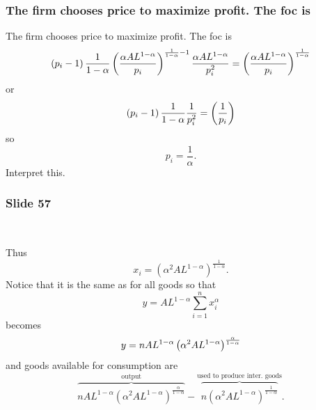 \documentclass[aspectratio=169]{ltx-talk}
\begin{document}
\begin{frame}
\frametitle{The firm chooses price to maximize profit. The foc is}
The firm chooses price to maximize profit. The foc is%
\begin{equation*}
\left( p_{i}-1\right) \frac{1}{1-\alpha }\left( \frac{\alpha AL^{1-\alpha }}{%
p_{i}}\right) ^{\frac{1}{1-\alpha }-1}\frac{\alpha AL^{1-\alpha }}{p_{i}^{2}}%
=\left( \frac{\alpha AL^{1-\alpha }}{p_{i}}\right) ^{\frac{1}{1-\alpha }}
\end{equation*}%
or%
\begin{equation*}
\left( p_{i}-1\right) \frac{1}{1-\alpha }\frac{1}{p_{i}^{2}}=\left( \frac{1}{%
p_{i}}\right)
\end{equation*}%
so 
\begin{equation*}
p_{i}=\frac{1}{\alpha }.
\end{equation*}%
Interpret this.\textit{\ }
\end{frame}

\begin{frame}
\frametitle{Slide 57}
\ 

Thus%
\begin{equation*}
x_{i}=\left( \alpha ^{2}AL^{1-\alpha }\right) ^{\frac{1}{1-\alpha }}.
\end{equation*}%
Notice that it is the same as for all goods so that%
\begin{equation*}
y=AL^{1-\alpha }\overset{n}{\underset{i=1}{\sum }}x_{i}^{\alpha }
\end{equation*}%
becomes%
\begin{equation*}
y=nAL^{1-\alpha }\left( \alpha ^{2}AL^{1-\alpha }\right) ^{\frac{\alpha }{%
1-\alpha }}
\end{equation*}%
and goods available for consumption are 
\begin{equation*}
\overset{\text{output}}{\overbrace{nAL^{1-\alpha }\left( \alpha
^{2}AL^{1-\alpha }\right) ^{\frac{\alpha }{1-\alpha }}}}-\overset{\text{used
to produce inter. goods}}{\overbrace{n\left( \alpha ^{2}AL^{1-\alpha
}\right) ^{\frac{1}{1-\alpha }}}}.
\end{equation*}%
$\allowbreak $
\end{frame}
\end{document}
